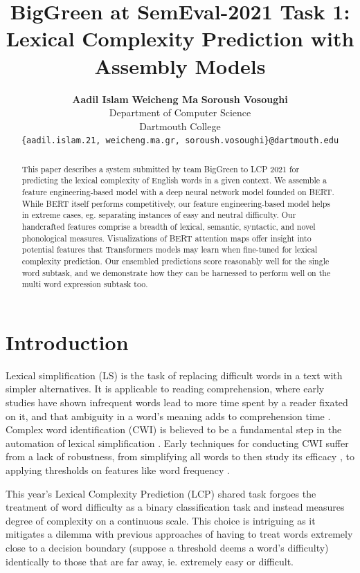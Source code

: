 \documentclass[11pt,a4paper]{article}
\title{BigGreen at SemEval-2021 Task 1: \\
Lexical Complexity Prediction with Assembly Models}
\author{
  \textbf{Aadil Islam}\normalfont{,} \textbf{Weicheng Ma}\normalfont{,} \textbf{Soroush Vosoughi}\\
  Department of Computer Science\\
  Dartmouth College\\
  \texttt{\{aadil.islam.21, weicheng.ma.gr, soroush.vosoughi\}@dartmouth.edu}
}
\date{}
\begin{document}
\maketitle

\begin{abstract}
  This paper describes a system submitted by team BigGreen to LCP 2021 for predicting the lexical complexity of English words in a given context. We assemble a feature engineering-based model with a deep neural network model founded on BERT. While BERT itself performs competitively, our feature engineering-based model helps in extreme cases, eg. separating instances of easy and neutral difficulty. Our handcrafted features comprise a breadth of lexical, semantic, syntactic, and novel phonological measures. Visualizations of BERT attention maps offer insight into potential features that Transformers models may learn when fine-tuned for lexical complexity prediction. Our ensembled predictions score reasonably well for the single word subtask, and we demonstrate how they can be harnessed to perform well on the multi word expression subtask too.
\end{abstract}

\section{Introduction}

Lexical simplification (LS) is the task of replacing difficult words in a text with simpler alternatives. It is applicable to reading comprehension, where early studies have shown infrequent words lead to more time spent by a reader fixated on it, and that ambiguity in a word's meaning adds to comprehension time \citep{raynerd86}. Complex word identification (CWI) is believed to be a fundamental step in the automation of lexical simplification \citep{shardlow2014open}. Early techniques for conducting CWI suffer from a lack of robustness, from simplifying all words to then study its efficacy \citep{devlintait}, to applying thresholds on features like word frequency \citep{10.1007/11573067_19}. 

This year's Lexical Complexity Prediction (LCP) shared task \citep{shardlow2021semeval} forgoes the treatment of word difficulty as a binary classification task \citep{paetzoldspecia:2016:SemEval1, stajner-EtAl:2018:BEA} and instead measures degree of complexity on a continuous scale. This choice is intriguing as it mitigates a dilemma with previous approaches of having to treat words extremely close to a decision boundary (suppose a threshold deems a word's difficulty) identically to those that are far away, ie. extremely easy or difficult.
\end{document}
